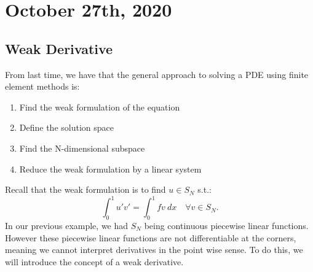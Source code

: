 \documentclass[../main/main.tex]{subfiles}
\begin{document}
\section{October 27th, 2020}
\subsection{Weak Derivative}
From last time, we have that the general approach to solving a PDE using finite element methods is: 
\begin{enumerate}
    \item Find the weak formulation of the equation
    \item Define the solution space
    \item Find the N-dimensional subspace
    \item Reduce the weak formulation by a linear system
\end{enumerate}
Recall that the weak formulation is to find $u\in S_N$ s.t.: \[
\int^1_0 u'v' = \int^1_0 fv~dx \quad \forall v \in  S_N
.\]  In our previous example, we had $S_N$ being continuous piecewise linear functions. However these piecewise linear functions  are not differentiable  at the corners, meaning we cannot interpret derivatives in the point wise sense.  To do this, we will introduce the concept of a weak derivative.
\end{document}
